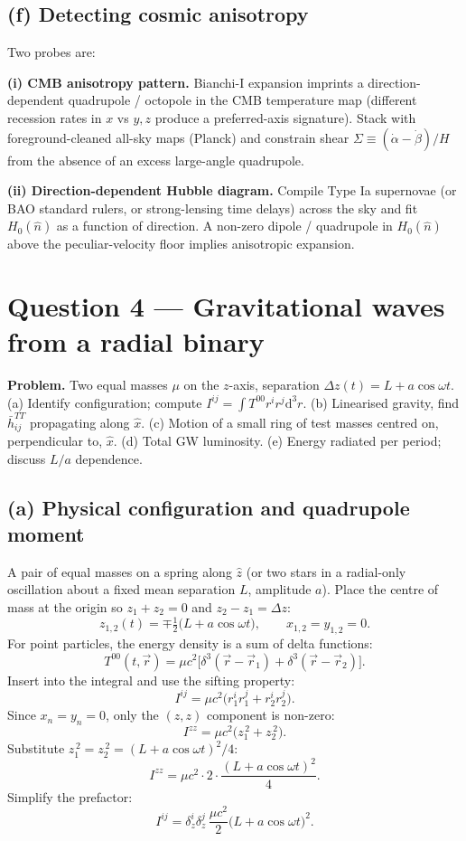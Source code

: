 \documentclass[11pt]{article}
\newcommand{\de}{\mathrm{d}}
\begin{document}
\subsection*{(f) Detecting cosmic anisotropy}

Two probes are:

\textbf{(i) CMB anisotropy pattern.} Bianchi-I expansion imprints a direction-dependent quadrupole / octopole in the CMB temperature map (different recession rates in $x$ vs $y,z$ produce a preferred-axis signature). Stack with foreground-cleaned all-sky maps (Planck) and constrain shear $\Sigma\equiv(\dot\alpha-\dot\beta)/H$ from the absence of an excess large-angle quadrupole.

\textbf{(ii) Direction-dependent Hubble diagram.} Compile Type Ia supernovae (or BAO standard rulers, or strong-lensing time delays) across the sky and fit $H_0(\hat n)$ as a function of direction. A non-zero dipole / quadrupole in $H_0(\hat n)$ above the peculiar-velocity floor implies anisotropic expansion.

\section*{Question 4 --- Gravitational waves from a radial binary}

\textbf{Problem.} Two equal masses $\mu$ on the $z$-axis, separation $\Delta z(t)=L+a\cos\omega t$. (a) Identify configuration; compute $I^{ij}=\int T^{00}r^ir^j\de^3r$. (b) Linearised gravity, find $\bar h^{TT}_{ij}$ propagating along $\hat x$. (c) Motion of a small ring of test masses centred on, perpendicular to, $\hat x$. (d) Total GW luminosity. (e) Energy radiated per period; discuss $L/a$ dependence.

\subsection*{(a) Physical configuration and quadrupole moment}

A pair of equal masses on a spring along $\hat z$ (or two stars in a radial-only oscillation about a fixed mean separation $L$, amplitude $a$). Place the centre of mass at the origin so $z_1+z_2=0$ and $z_2-z_1=\Delta z$:
\[
z_{1,2}(t)=\mp\tfrac12\bigl(L+a\cos\omega t\bigr),\qquad x_{1,2}=y_{1,2}=0.
\]
For point particles, the energy density is a sum of delta functions:
\[
T^{00}(t,\vec r)=\mu c^2\bigl[\delta^3(\vec r-\vec r_1)+\delta^3(\vec r-\vec r_2)\bigr].
\]
Insert into the integral and use the sifting property:
\[
I^{ij}=\mu c^2\bigl(r_1^i r_1^j+r_2^i r_2^j\bigr).
\]
Since $x_n=y_n=0$, only the $(z,z)$ component is non-zero:
\[
I^{zz}=\mu c^2\bigl(z_1^{\,2}+z_2^{\,2}\bigr).
\]
Substitute $z_1^{\,2}=z_2^{\,2}=(L+a\cos\omega t)^2/4$:
\[
I^{zz}=\mu c^2\cdot 2\cdot\frac{(L+a\cos\omega t)^2}{4}.
\]
Simplify the prefactor:
\begin{equation}
\boxed{\ I^{ij}=\delta^i_z\delta^j_z\,\frac{\mu c^2}{2}\bigl(L+a\cos\omega t\bigr)^2.\ }
\label{eq:Ibox}
\end{equation}
\end{document}
